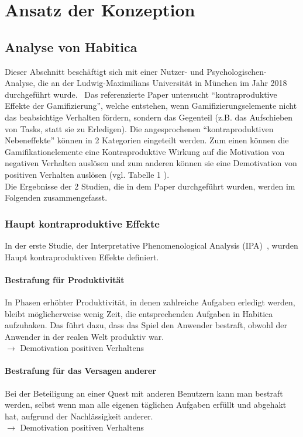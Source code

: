 \documentclass[sigconf, nonacm]{acmart}
\begin{document}
\section{Ansatz der Konzeption}

\subsection{Analyse von Habitica}
Dieser Abschnitt beschäftigt sich mit einer Nutzer- und Psychologischen- Analyse, die an der Ludwig-Maximilians Universität in München im Jahr 2018 durchgeführt wurde.~\cite{diefenbach_counterproductive_2019} Das referenzierte Paper untersucht \enquote{kontraproduktive Effekte der Gamifizierung}, welche entstehen, wenn Gamifizierungselemente nicht das beabsichtige Verhalten fördern, sondern das Gegenteil (z.B. das Aufschieben von Tasks, statt sie zu Erledigen). 
Die angesprochenen \enquote{kontraproduktiven Nebeneffekte} können in 2 Kategorien eingeteilt werden. Zum einen können die Gamifikationelemente eine Kontraproduktive Wirkung auf die Motivation von negativen Verhalten auslösen und zum anderen können sie eine Demotivation von positiven Verhalten auslösen (vgl. Tabelle 1 \cite{diefenbach_counterproductive_2019}).
\\
Die Ergebnisse der 2 Studien, die in dem Paper durchgeführt wurden, werden im Folgenden zusammengefasst.
\\
\subsubsection{Haupt kontraproduktive Effekte}
In der erste Studie, der  Interpretative Phenomenological Analysis (IPA)~\cite{smith_reflecting_2004}, wurden Haupt kontraproduktiven Effekte definiert.

\paragraph{Bestrafung für Produktivität}\label{sec:cpe1}
In Phasen erhöhter Produktivität, in denen zahlreiche Aufgaben erledigt werden, bleibt möglicherweise wenig Zeit, die entsprechenden Aufgaben in Habitica aufzuhaken. Das führt dazu, dass das Spiel den Anwender bestraft, obwohl der Anwender in der realen Welt produktiv war.\\
$\rightarrow$ Demotivation positiven Verhaltens

\paragraph{Bestrafung für das Versagen  anderer}\label{sec:cpe2}
Bei der Beteiligung an einer Quest mit anderen Benutzern kann man bestraft werden, selbst wenn man alle eigenen täglichen Aufgaben erfüllt und abgehakt hat, aufgrund der Nachlässigkeit anderer.\\
$\rightarrow$ Demotivation positiven Verhaltens
\end{document}
